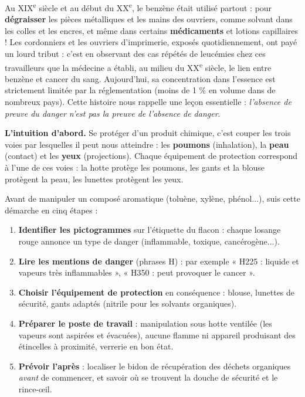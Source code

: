 \documentclass[11pt]{article}
\newcommand{\cle}[1]{{\popxbold\color{popdark}#1}}
\newcounter{popsec}
\newcounter{popsub}
\newcommand{\courssub}[1]{%
  \stepcounter{popsub}%
  \par\vspace{9pt}\noindent{\popxbold\fontsize{11.5}{13}\selectfont\color{popink}{\color{poporange}\thepopsec.\thepopsub}\hspace{6pt}#1}\par\nopagebreak\vspace{4pt}
}
\begin{document}
\begin{savaistu}
Au XIX\textsuperscript{e} siècle et au début du XX\textsuperscript{e}, le benzène était utilisé partout : pour \textbf{dégraisser} les pièces métalliques et les mains des ouvriers, comme solvant dans les colles et les encres, et même dans certains \textbf{médicaments} et lotions capillaires ! Les cordonniers et les ouvriers d'imprimerie, exposés quotidiennement, ont payé un lourd tribut : c'est en observant des cas répétés de leucémies chez ces travailleurs que la médecine a établi, au milieu du XX\textsuperscript{e} siècle, le lien entre benzène et cancer du sang. Aujourd'hui, sa concentration dans l'essence est strictement limitée par la réglementation (moins de 1 \% en volume dans de nombreux pays). Cette histoire nous rappelle une leçon essentielle : \emph{l'absence de preuve du danger n'est pas la preuve de l'absence de danger}.
\end{savaistu}

\courssub{Les mesures de sécurité au laboratoire}

\textbf{L'intuition d'abord.} Se protéger d'un produit chimique, c'est couper les trois voies par lesquelles il peut nous atteindre : les \textbf{poumons} (inhalation), la \textbf{peau} (contact) et les \textbf{yeux} (projections). Chaque équipement de protection correspond à l'une de ces voies : la hotte protège les poumons, les gants et la blouse protègent la peau, les lunettes protègent les yeux.

\begin{methode}
Avant de manipuler un composé aromatique (toluène, xylène, phénol...), suis cette démarche en cinq étapes :
\begin{enumerate}
\item \textbf{Identifier les pictogrammes} sur l'étiquette du flacon : chaque losange rouge annonce un type de danger (inflammable, toxique, cancérogène...).
\item \textbf{Lire les mentions de danger} (phrases H) : par exemple « H225 : liquide et vapeurs très inflammables », « H350 : peut provoquer le cancer ».
\item \textbf{Choisir l'équipement de protection} en conséquence : blouse, lunettes de sécurité, gants adaptés (nitrile pour les solvants organiques).
\item \textbf{Préparer le poste de travail} : manipulation sous \cle{hotte ventilée} (les vapeurs sont aspirées et évacuées), aucune flamme ni appareil produisant des étincelles à proximité, verrerie en bon état.
\item \textbf{Prévoir l'après} : localiser le bidon de récupération des déchets organiques \emph{avant} de commencer, et savoir où se trouvent la douche de sécurité et le rince-œil.
\end{enumerate}
\end{methode}
\end{document}

